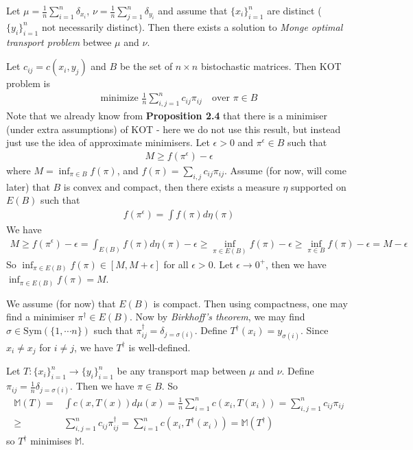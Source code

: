 \documentclass[12pt,a4paper]{article}
\newenvironment{proof}
{\begin{changemargin}{1cm}{0.5cm} 
	}%
	{\end{changemargin}
}
\begin{document}
 Let $\mu = \frac{1}{n} \sum_{i=1}^n \delta_{x_i}$, $\nu = \frac{1}{n} \sum_{j=1}^n \delta_{y_i}$ and assume that $\{x_i \}_{i=1}^n$ are distinct ($\{y_i\}_{i=1}^n$ not necessarily distinct). Then there exists a solution to \emph{Monge optimal transport problem} betwee $\mu$ and $\nu$. 
\begin{proof}
\pf Let $c_{ij} = c(x_i, y_j)$ and $B$ be the set of $n\times n$ bistochastic matrices. Then KOT problem is
\begin{align*}
\text{minimize } \frac{1}{n} \sum_{i,j=1}^n c_{ij} \pi_{ij} \quad \text{over }\pi\in B
\end{align*}
Note that we already know from \textbf{Proposition 2.4} that there is a minimiser (under extra assumptions) of KOT - here we do not use this result, but instead just use the idea of approximate minimisers. Let $\epsilon >0$ and $\pi^{\epsilon} \in B$ such that
\begin{align*}
M \geq f(\pi^{\epsilon}) - \epsilon
\end{align*}
where $M = \inf_{\pi \in B} f(\pi)$, and $f(\pi) = \sum_{i,j}c_{ij} \pi_{ij}$. Assume (for now, will come later) that $B$ is convex and compact, then there exists a measure $\eta$ supported on $E(B)$ such that
\begin{align*}
f(\pi^{\epsilon}) = \int f(\pi) d\eta(\pi)
\end{align*}
We have
\begin{align*}
M \geq f(\pi^{\epsilon}) - \epsilon =\int_{E(B)} f(\pi) d\eta (\pi)- \epsilon \geq \inf_{\pi \in E(B)} f(\pi) - \epsilon \geq \inf_{\pi \in B} f(\pi) - \epsilon = M -\epsilon
\end{align*}
So $\inf_{\pi \in E(B)} f(\pi) \in [M, M+ \epsilon]$ for all $\epsilon >0$. Let $\epsilon \rightarrow 0^+$, then we have $\inf_{\pi \in E(B)} f(\pi) = M$.

\quad We assume (for now) that $E(B)$ is compact. Then using compactness, one may find a minimiser $\pi^{\dagger} \in E(B)$.
Now by \emph{Birkhoff's theorem}, we may find $\sigma \in \text{Sym}(\{1, \cdots n\})$ such that $\pi_{ij}^{\dagger} = \delta_{j = \sigma(i)}$. Define $T^{\dagger}(x_i) = y_{\sigma(i)}$. Since $x_i \neq x_j$ for $i\neq j$, we have $T^{\dagger}$ is well-defined.

\quad Let $T : \{x_i \}_{i=1}^n \rightarrow \{y_i \}_{i=1}^n$ be any transport map between $\mu$ and $\nu$. Define $\pi_{ij} = \frac{1}{n} \delta_{j = \sigma(i)}$. Then we have $\pi \in B$. So
\begin{align*}
\mathbb{M}(T) =& \int c(x, T(x)) d\mu(x) =\frac{1}{n} \sum_{i=1}^n c(x_i, T(x_i)) = \sum_{i,j=1}^n c_{ij}\pi_{ij} \\
\geq& \sum_{i,j=1}^n c_{ij}\pi^{\dagger}_{ij} = \sum_{i=1}^n c(x_i, T^{\dagger}(x_i)) = \mathbb{M}(T^{\dagger})
\end{align*}
so $T^{\dagger}$ minimises $\mathbb{M}$.
\s


\end{proof}
\end{document}
